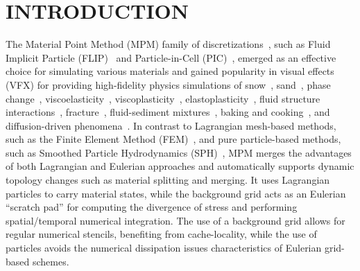 \section{INTRODUCTION}
\label{sec:introduction}
The Material Point Method (MPM) family of discretizations~\cite{Sulsky:1994:Particle}, such as Fluid Implicit Particle (FLIP)~\cite{Brackbill:1988:Flip} and Particle-in-Cell (PIC)~\cite{Sulsky:1995:PIC}, emerged as an effective choice for simulating various materials and gained popularity in visual effects (VFX) for providing high-fidelity physics simulations of snow~\cite{Stomakhin:2013:MPMsnow}, sand~\cite{Klar:2016:Drucker,Daviet:2016:Semi-implicit}, phase change~\cite{Stomakhin:2014:Augmented,gao2018gpu}, viscoelasticity~\cite{Ram:2015:Material,yue:2015:mpm-plasticity,Su:2021:USOSVL}, viscoplasticity~\cite{Fang:2019:Silly}, elastoplasticity~\cite{Gao:2017:AGIMPM}, fluid structure interactions~\cite{Fang:2020:IQ-MPM}, fracture~\cite{Wolper:2019:CD-MPM,hegemann:2013:ductile}, fluid-sediment mixtures~\cite{Tampubolon:2017:Multi,gao2018animating}, baking and cooking~\cite{Ding:2019:Thermomechanical}, and diffusion-driven phenomena~\cite{XUE:2020:NF}.
In contrast to Lagrangian mesh-based methods, such as the Finite Element Method (FEM)~\cite{Zienkiewicz:1977:FEM,Sifakis:2012:FEM}, and pure particle-based methods, such as Smoothed Particle Hydrodynamics (SPH)~\cite{Desbrun:1996:SPH,Liu:2008:Overview}, MPM merges the advantages of both Lagrangian and Eulerian approaches and automatically supports dynamic topology changes such as material splitting and merging. 
It uses Lagrangian particles to carry material states, while the background grid acts as an Eulerian ``scratch pad'' for computing the divergence of stress and performing spatial/temporal numerical integration. 
The use of a background grid allows for regular numerical stencils, benefiting from cache-locality, while the use of particles avoids the numerical dissipation issues characteristics of Eulerian grid-based schemes.


